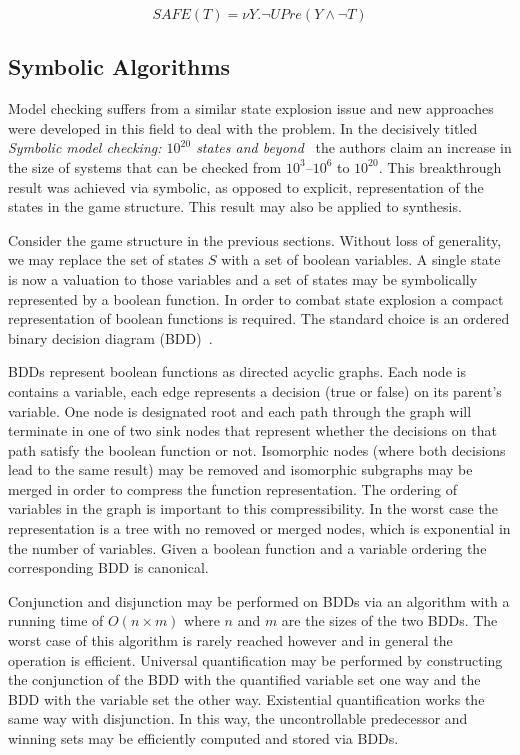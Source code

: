 $$ SAFE(T) = \nu Y . \lnot UPre( Y \land \lnot T ) $$

\subsection{Symbolic Algorithms}

Model checking suffers from a similar state explosion issue and new approaches were developed in this field to deal with the problem.  In the decisively titled \emph{Symbolic model checking: $10^{20}$ states and beyond}~\cite{Burch90} the authors claim an increase in the size of systems that can be checked from $10^3$--$10^6$ to $10^{20}$. This breakthrough result was achieved via symbolic, as opposed to explicit, representation of the states in the game structure. This result may also be applied to synthesis.

Consider the game structure in the previous sections. Without loss of generality, we may replace the set of states $S$ with a set of boolean variables. A single state is now a valuation to those variables and a set of states may be symbolically represented by a boolean function. In order to combat state explosion a compact representation of boolean functions is required. The standard choice is an ordered binary decision diagram (BDD)~\cite{Bryant86}.

BDDs represent boolean functions as directed acyclic graphs. Each node is contains a variable, each edge represents a decision (true or false) on its parent's variable. One node is designated root and each path through the graph will terminate in one of two sink nodes that represent whether the decisions on that path satisfy the boolean function or not. Isomorphic nodes (where both decisions lead to the same result) may be removed and isomorphic subgraphs may be merged in order to compress the function representation. The ordering of variables in the graph is important to this compressibility. In the worst case the representation is a tree with no removed or merged nodes, which is exponential in the number of variables. Given a boolean function and a variable ordering the corresponding BDD is canonical.

Conjunction and disjunction may be performed on BDDs via an algorithm with a running time of $O(n \times m)$ where $n$ and $m$ are the sizes of the two BDDs. The worst case of this algorithm is rarely reached however and in general the operation is efficient. Universal quantification may be performed by constructing the conjunction of the BDD with the quantified variable set one way and the BDD with the variable set the other way. Existential quantification works the same way with disjunction. In this way, the uncontrollable predecessor and winning sets may be efficiently computed and stored via BDDs.

